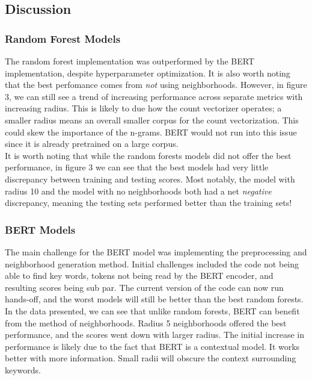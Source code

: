\documentclass[12pt, a4paper]{article}
\begin{document}
\subsection{Discussion}

\subsubsection{Random Forest Models}
The random forest implementation was outperformed by the BERT implementation, despite hyperparameter optimization. It is also worth noting that the best perfomance comes from \textit{not} using neighborhoods. However, in figure 3, we can still see a trend of increasing performance across separate metrics with increasing radius. This is likely to due how the count vectorizer operates; a smaller radius means an overall smaller corpus for the count vectorization. This could skew the importance of the n-grams. BERT would not run into this issue since it is already pretrained on a large corpus.\\

It is worth noting that while the random forests models did not offer the best performance, in figure 3 we can see that the best models had very little discrepancy between training and testing scores. Most notably, the model with radius 10 and the model with no neighborhoods both had a net \textit{negative} discrepancy, meaning the testing sets performed better than the training sets!\\

\subsubsection{BERT Models}
The main challenge for the BERT model was implementing the preprocessing and neighborhood generation method. Initial challenges included the code not being able to find key words, tokens not being read by the BERT encoder, and resulting scores being sub par. The current version of the code can now run hands-off, and the worst models will still be better than the best random forests. In the data presented, we can see that unlike random forests, BERT can benefit from the method of neighborhoods. Radius 5 neighborhoods offered the best performance, and the scores went down with larger radius. The initial increase in performance is likely due to the fact that BERT is a contextual model. It works better with more information. Small radii will obscure the context surrounding keywords.\\
\end{document}
